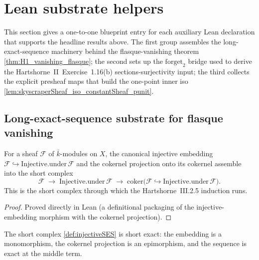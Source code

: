 \section{Lean substrate helpers}
\label{sec:H1Vanishing_substrate}

This section gives a one-to-one blueprint entry for each auxiliary Lean
declaration that supports the headline results above. The first group
assembles the long-exact-sequence machinery behind the flasque-vanishing
theorem \cref{thm:H1_vanishing_flasque}; the second sets up the
\(\mathrm{forget}_2\) bridge used to derive the
Hartshorne~II~Exercise~1.16(b) sections-surjectivity input; the third
collects the explicit presheaf maps that build the one-point inner iso
\cref{lem:skyscraperSheaf_iso_constantSheaf_punit}.

\subsection{Long-exact-sequence substrate for flasque vanishing}

\begin{definition}
  \label{def:injectiveSES}
  For a sheaf \(\mathcal F\) of \(\bar k\)-modules on \(X\), the
  canonical injective embedding \(\mathcal F \hookrightarrow
  \mathrm{Injective.under}\,\mathcal F\) and the cokernel projection
  onto its cokernel assemble into the short complex
  \[
    \mathcal F \;\longrightarrow\; \mathrm{Injective.under}\,\mathcal F
    \;\longrightarrow\; \mathrm{coker}\bigl(\mathcal F \hookrightarrow
    \mathrm{Injective.under}\,\mathcal F\bigr).
  \]
  This is the short complex through which the Hartshorne~III.2.5
  induction runs.
\end{definition}

\begin{proof}\leanok
 Proved directly in Lean (a definitional packaging of the
  injective-embedding morphism with the cokernel projection).
\end{proof}

\begin{lemma}
  \label{lem:injectiveSES_shortExact}
  The short complex \cref{def:injectiveSES} is short exact: the
  embedding is a monomorphism, the cokernel projection is an
  epimorphism, and the sequence is exact at the middle term.
\end{lemma}

